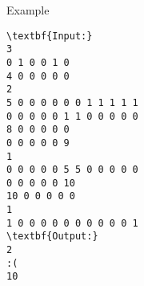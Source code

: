 Example
\begin{verbatim}
\textbf{Input:}
3
0 1 0 0 1 0 
4 0 0 0 0 0
2
5 0 0 0 0 0 0 1 1 1 1 1
0 0 0 0 0 1 1 0 0 0 0 0
8 0 0 0 0 0
0 0 0 0 0 9
1
0 0 0 0 0 5 5 0 0 0 0 0
0 0 0 0 0 10
10 0 0 0 0 0
1
1 0 0 0 0 0 0 0 0 0 0 1
\textbf{Output:}
2
:(
10\end{verbatim}